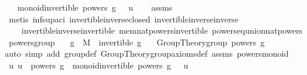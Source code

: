 \begin{isabellebody}
\ \ \ {\isachardoublequoteopen}monoid{\isachardot}{\kern0pt}invertible\ {\isacharparenleft}{\kern0pt}powers\ g{\isacharparenright}{\kern0pt}\ {\isacharparenleft}{\kern0pt}{\isasymcdot}{\isacharparenright}{\kern0pt}\ {\isasymone}\ u{\isachardoublequoteclose}\isanewline
%
\isadelimproof
\ \ %
\endisadelimproof
%
\isatagproof
{}\isamarkupfalse%
\ assms\ \isamarkupfalse%
\ {\isacharparenleft}{\kern0pt}metis\ inf{\isacharunderscore}{\kern0pt}sup{\isacharunderscore}{\kern0pt}aci{\isacharparenleft}{\kern0pt}{}{\isacharparenright}{\kern0pt}\ invertible{\isacharunderscore}{\kern0pt}inverse{\isacharunderscore}{\kern0pt}closed\ invertible{\isacharunderscore}{\kern0pt}inverse{\isacharunderscore}{\kern0pt}inverse\ \isanewline
\ \ \ \ invertible{\isacharunderscore}{\kern0pt}inverse{\isacharunderscore}{\kern0pt}invertible\ mem{\isacharunderscore}{\kern0pt}nat{\isacharunderscore}{\kern0pt}powers{\isacharunderscore}{\kern0pt}invertible\ powers{\isacharunderscore}{\kern0pt}eq{\isacharunderscore}{\kern0pt}union{\isacharunderscore}{\kern0pt}nat{\isacharunderscore}{\kern0pt}powers{\isacharparenright}{\kern0pt}%
\endisatagproof
{\isafoldproof}%
%
\isadelimproof
\isanewline
%
\endisadelimproof
\isanewline
{}\isamarkupfalse%
\ powers{\isacharunderscore}{\kern0pt}group{\isacharcolon}{\kern0pt}\isanewline
\ \ \ {\isachardoublequoteopen}g\ {\isasymin}\ M{\isachardoublequoteclose}\ \ {\isachardoublequoteopen}invertible\ g{\isachardoublequoteclose}\isanewline
\ \ \ {\isachardoublequoteopen}Group{\isacharunderscore}{\kern0pt}Theory{\isachardot}{\kern0pt}group\ {\isacharparenleft}{\kern0pt}powers\ g{\isacharparenright}{\kern0pt}\ {\isacharparenleft}{\kern0pt}{\isasymcdot}{\isacharparenright}{\kern0pt}\ {\isasymone}{\isachardoublequoteclose}\isanewline
%
\isadelimproof
%
\endisadelimproof
%
\isatagproof
{}\isamarkupfalse%
{\isacharparenleft}{\kern0pt}auto\ simp\ add{\isacharcolon}{\kern0pt}\ group{\isacharunderscore}{\kern0pt}def\ Group{\isacharunderscore}{\kern0pt}Theory{\isachardot}{\kern0pt}group{\isacharunderscore}{\kern0pt}axioms{\isacharunderscore}{\kern0pt}def\ assms\ powers{\isacharunderscore}{\kern0pt}monoid{\isacharparenright}{\kern0pt}\isanewline
\ \ \isamarkupfalse%
\ {\isachardoublequoteopen}{\isasymAnd}u{\isachardot}{\kern0pt}\ u\ {\isasymin}\ powers\ g\ {\isasymLongrightarrow}\ monoid{\isachardot}{\kern0pt}invertible\ {\isacharparenleft}{\kern0pt}powers\ g{\isacharparenright}{\kern0pt}\ {\isacharparenleft}{\kern0pt}{\isasymcdot}{\isacharparenright}{\kern0pt}\ {\isasymone}\ u{\isachardoublequoteclose}\ \isamarkupfalse%

\end{isabellebody}
